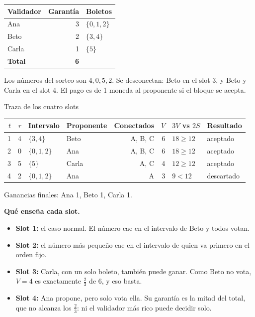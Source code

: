\documentclass[11pt,a4paper]{article}
\theoremstyle{definition}
\theoremstyle{plain}
\theoremstyle{remark}
\begin{document}
\begin{center}
\small
\begin{tabular}{@{}lrl@{}}
\toprule
Validador & Garantía & Boletos \\
\midrule
Ana   & 3 & $\{0,1,2\}$ \\
Beto  & 2 & $\{3,4\}$ \\
Carla & 1 & $\{5\}$ \\
\midrule
\textbf{Total} & \textbf{6} & \\
\bottomrule
\end{tabular}
\end{center}

Los números del sorteo son $4, 0, 5, 2$. Se desconectan: Beto en el slot 3, y
Beto y Carla en el slot 4. El pago es de 1 moneda al proponente si el bloque se
acepta.

\begin{laboratorio}{Traza de los cuatro slots}
\centering
\small
\begin{tabular}{@{}rrllrrll@{}}
\toprule
$t$ & $r$ & Intervalo & Proponente & Conectados & $V$ & $3V$ vs $2S$ & Resultado \\
\midrule
1 & 4 & $\{3,4\}$   & Beto  & A, B, C & 6 & $18 \ge 12$ & aceptado \\
2 & 0 & $\{0,1,2\}$ & Ana   & A, B, C & 6 & $18 \ge 12$ & aceptado \\
3 & 5 & $\{5\}$     & Carla & A, C    & 4 & $12 \ge 12$ & aceptado \\
4 & 2 & $\{0,1,2\}$ & Ana   & A       & 3 & $9 < 12$    & descartado \\
\bottomrule
\end{tabular}

\vspace{0.6em}
Ganancias finales: Ana 1, Beto 1, Carla 1.
\end{laboratorio}

\textbf{Qué enseña cada slot.}
\begin{itemize}
  \item \textbf{Slot 1:} el caso normal. El número cae en el intervalo de Beto y
        todos votan.
  \item \textbf{Slot 2:} el número más pequeño cae en el intervalo de quien va
        primero en el orden fijo.
  \item \textbf{Slot 3:} Carla, con un solo boleto, también puede ganar. Como
        Beto no vota, $V = 4$ es exactamente $\frac23$ de 6, y eso basta.
  \item \textbf{Slot 4:} Ana propone, pero solo vota ella. Su garantía es la
        mitad del total, que no alcanza los $\frac23$: ni el validador más rico
        puede decidir solo.
\end{itemize}
\end{document}
